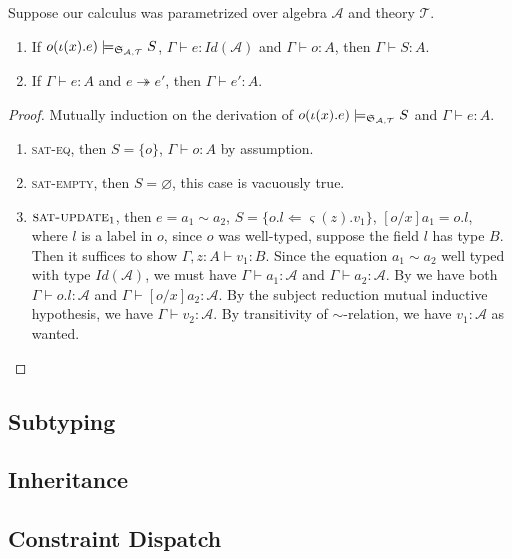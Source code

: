 \begin{thm}
  Suppose our calculus was parametrized over algebra $\mathcal{A}$ and theory
  $\mathcal{T}$.
  \begin{enumerate}
    \item If $o(\iota(x) . e) \models_{{\mathfrak{S}_{\mathcal{A},\mathcal{T}}}} S$, $\Gamma \vdash e :
      Id(\mathcal{A})$ and $\Gamma \vdash o : A$, then $\Gamma \vdash S : A$.
    \item If $\Gamma \vdash e : A$ and $e \twoheadrightarrow e'$, then $\Gamma
      \vdash e' : A$.
  \end{enumerate}
\end{thm}

\begin{proof}
  Mutually induction on the derivation of $o(\iota(x) . e) \models_{{\mathfrak{S}_{\mathcal{A},\mathcal{T}}}} S$
  and $\Gamma \vdash e : A$.
  \begin{enumerate}
    \item \textsc{sat-eq}, then $S = \{o\}$, $\Gamma \vdash o : A$ by assumption.
    \item \textsc{sat-empty}, then $S = \varnothing$, this case is vacuously
      true.
    \item $\textsc{sat-update}_1$, then $e = a_1 \sim a_2$, $S = \{o.l
      \Leftarrow \varsigma(z).v_1\}$, $[o/x]a_1 = o.l$, where $l$ is a label in
      $o$, since $o$ was well-typed, suppose the field $l$ has type $B$. Then it
      suffices to show $\Gamma , z : A \vdash v_1 : B$. Since the equation $a_1
      \sim a_2$ well typed with type $Id(\mathcal{A})$, we must have $\Gamma
      \vdash a_1 : \mathcal{A}$ and $\Gamma \vdash a_2 : \mathcal{A}$. By
       we have both $\Gamma \vdash o.l : \mathcal{A}$ and
      $\Gamma \vdash [o/x]a_2 : \mathcal{A}$. By the subject reduction mutual
      inductive hypothesis, we have $\Gamma \vdash v_2 : \mathcal{A}$. By
      transitivity of $\sim$-relation, we have $v_1 : \mathcal{A}$ as wanted.
  \end{enumerate}
\end{proof}

\subsection{Subtyping}

\subsection{Inheritance}

\subsection{Constraint Dispatch}